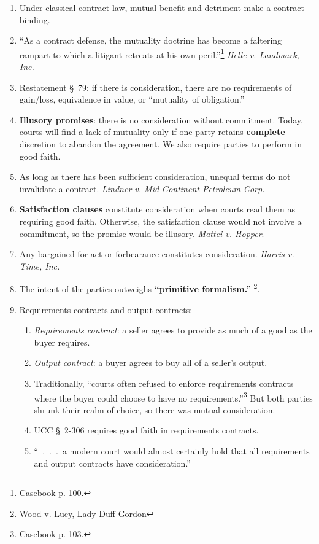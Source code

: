 \begin{enumerate}
    \item Under classical contract law, mutual benefit and detriment make a 
    contract binding.
    \item ``As a contract defense, the mutuality doctrine has become a 
    faltering rampart to which a litigant retreats at his own 
    peril.''\footnote{Casebook p.  100.} \emph{Helle v. Landmark, Inc.}
    \item Restatement \S\ 79: if there is consideration, there are no 
    requirements of gain/loss, equivalence in value, or ``mutuality of 
    obligation.''
    \item \textbf{Illusory promises}: there is no consideration without 
    commitment. Today, courts will find a lack of mutuality only if one party 
    retains \textbf{complete} discretion to abandon the agreement. We also 
    require parties to perform in good faith.
    \item As long as there has been sufficient consideration, unequal terms do 
    not invalidate a contract. \emph{Lindner v. Mid-Continent Petroleum Corp.}
    \item \textbf{Satisfaction clauses} constitute consideration when courts 
    read them as requiring good faith. Otherwise, the satisfaction clause 
    would not involve a commitment, so the promise would be illusory. 
    \emph{Mattei v. Hopper}.
    \item Any bargained-for act or forbearance constitutes consideration. 
    \emph{Harris v. Time, Inc.}
    \item The intent of the parties outweighs \textbf{``primitive 
    formalism.''} \footnote{Wood v. Lucy, Lady Duff-Gordon}.
    \item Requirements contracts and output contracts:
    \begin{enumerate}
        \item \emph{Requirements contract}: a seller agrees to provide as much 
        of a good as the buyer requires.
        \item \emph{Output contract}: a buyer agrees to buy all of a seller's 
        output.
        \item Traditionally, ``courts often refused to enforce requirements 
        contracts where the buyer could choose to have no 
        requirements.''\footnote{Casebook p. 103.} But both parties shrunk 
        their realm of choice, so there was mutual consideration.
        \item UCC \S\ 2-306 requires good faith in requirements contracts.
        \item ``~.~.~.~a modern court would almost certainly hold that all 
        requirements and output contracts have consideration.''
    \end{enumerate}
\end{enumerate}

